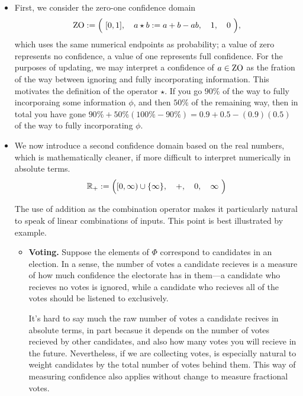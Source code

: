 \begin{itemize}
	\item
	First, we consider the zero-one confidence domain
	\[
		\mathrm{ZO} := \Big(~ [0,1],
			\quad a \star b :=
					a + b - ab,
			\quad 1,
			\quad 0 ~\Big),
	\]
	which uses the same numerical endpoints as probability;
	a value of zero represents no confidence, a value of one represents full confidence.
	For the purposes of updating, we may interpret a confidence of $a \in \mathrm{ZO}$ as the fration of the way between ignoring and fully incorporating information.
	This motivates the definition of the operator $\star$.
	If you go $90\%$ of the way to fully incorporaing some information $\phi$, and then $50\%$ of the remaining way, then in total you have gone $90\% + 50\%(100\%-90\%) = 0.9 + 0.5 - (0.9)(0.5)$ of the way to fully incorporating $\phi$.

	\item
	We now introduce a second confidence domain based on the real numbers,
	which is mathematically cleaner, if
		more difficult to interpret numerically in absolute terms.
	\[
		\mathbb R_+ :=
			\Big([0, \infty) \cup \{\infty\},
				\quad +,
				\quad 0,
				\quad \infty
				~\Big)
	\]

	The use of addition as the combination operator makes it particularly natural to speak of linear combinations of inputs.
	This point is best illustrated by example.

	\begin{itemize}
		\item \textbf{Voting.}
		Suppose the elements of $\Phi$ correspond to candidates in an election.
		In a sense, the number of votes a candidate recieves is a measure of how much confidence the electorate has in them---a candidate who recieves no votes is ignored, while a candidate who recieves all of the votes should be listened to exclusively.

		It's hard to say much  the raw number of votes a candidate recives in absolute terms, in part becasue it depends on the number of votes recieved by other candidates, and also how many votes you will recieve in the future.
		Nevertheless, if we are collecting votes, is especially natural to weight candidates by the total number of votes behind them.
		This way of measuring confidence also applies without change to measure fractional votes.


\end{itemize}
\end{itemize}
